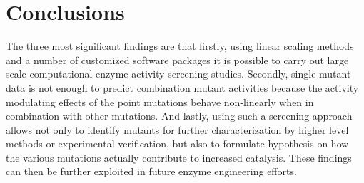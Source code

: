 \section{Conclusions}\label{sec:conclusions}
The three most significant findings are that firstly, using linear scaling methods and a number of customized software packages it is possible to carry out large scale computational enzyme activity screening studies.
Secondly, single mutant data is not enough to predict combination mutant activities because the activity modulating effects of the point mutations behave non-linearly when in combination with other mutations.
And lastly, using such a screening approach allows not only to identify mutants for further characterization by higher level methods or experimental verification, but also to formulate hypothesis on how the various mutations actually contribute to increased catalysis.
These findings can then be further exploited in future enzyme engineering efforts.
